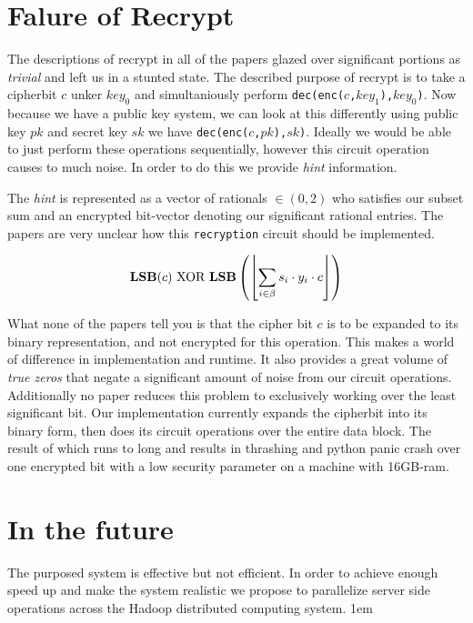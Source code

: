 \documentclass[letterpaper,11pt]{article} %
\begin{document}
\section*{Falure of Recrypt}
The descriptions of recrypt in all of the papers glazed over significant portions as {\em trivial} and left us in a stunted state. The described purpose of recrypt is to take a cipherbit \(c\) unker \(key_0\) and simultaniously perform  {\tt dec(enc(\(c\),\(key_1\)),\(key_0\))}. Now because we have a public key system, we can look at this differently using public key \(pk\) and secret key \(sk\)  we have {\tt dec(enc(\(c\),\(pk\)),\(sk\))}. Ideally we would be able to just perform these operations sequentially, however this circuit operation causes to much noise. In order to do this we provide {\em hint} information. 

The {\em hint } is represented as a vector of rationals \(\in (0,2)\) who satisfies our subset sum and an encrypted bit-vector denoting our significant rational entries. The papers are very unclear how this {\tt recryption} circuit should be implemented. 

\[ \text{{\bf LSB}}(c) \text{  XOR  } \text{{\bf LSB}}\left(\left\lfloor \sum\limits_{i\in\beta}s_i\cdot y_i\cdot c \right\rfloor\right)\]

What none of the papers tell you is that the cipher bit \(c\) is to be expanded to its binary representation, and not encrypted for this operation. This makes a world of difference in implementation and runtime. It also provides a great volume of {\em true zeros } that negate a significant amount of noise from our circuit operations. Additionally no paper reduces this problem to exclusively working over the least significant bit. Our implementation currently expands the cipherbit into its binary form, then does its circuit operations over the entire data block. The result of which runs to long and results in thrashing and python panic crash over one encrypted bit with a low security parameter on a machine with 16GB-ram. 



\section*{In the future}
\hspace{1em}The purposed system is effective but not efficient. In order to achieve enough speed up and make the system realistic we propose to parallelize server side operations across the Hadoop distributed computing system.
\parskip 1em
\end{document}
